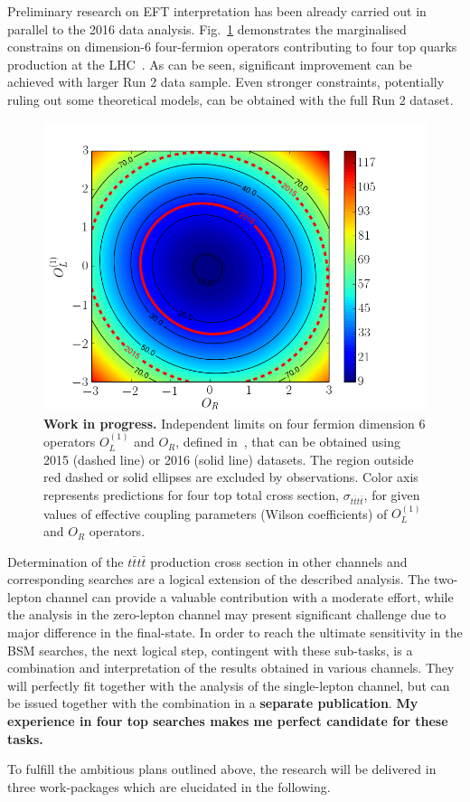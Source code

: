 \textcolor{\mynew}{
Preliminary research on EFT interpretation has been already carried out in parallel to the 2016 data analysis. Fig.~\ref{fig:C1_C2} demonstrates the marginalised constrains on dimension-6 four-fermion operators contributing to four top quarks production at the LHC~\cite{DegrandeEFTthesis,Zhang:2017mls}. As can be seen, significant improvement can be achieved with larger Run 2 data sample. Even stronger constraints, potentially ruling out some theoretical models, can be obtained with the full Run 2 dataset.
\begin{figure}[t]
\centering
\includegraphics[width=0.7\linewidth]{figures/C1_C2}
\caption{\textbf{Work in progress.} Independent limits on four fermion dimension 6 operators $O_{L}^{\left(1 \right) }$ and $O_R$, defined in~\cite{DegrandeEFTthesis}, that can be obtained using 2015 (dashed line) or 2016 (solid line) datasets. The region outside red dashed or solid ellipses are excluded by observations. Color axis represents predictions for four top total cross section, $\sigma_{t\bar{t}t\bar{t}}$, for given values of effective coupling parameters (Wilson coefficients) of $O_{L}^{\left(1 \right) }$ and $O_R$ operators.}
\label{fig:C1_C2}
\end{figure} 
}

\textcolor{\mycolor}{
Determination of the $t\bar{t}t\bar{t}$ production cross section in other channels and corresponding searches are a logical extension of the described analysis. The two-lepton channel can provide a valuable contribution with a moderate effort, while the analysis in the zero-lepton channel may present significant challenge due to major difference in the final-state. In order to reach the ultimate sensitivity in the BSM searches, the next logical step, contingent with these sub-tasks, is a combination and interpretation of the results obtained in various channels. They will perfectly fit together with the analysis of the single-lepton channel, but can be issued together with the combination in a \textbf{separate publication}. \textbf{My experience in four top searches makes me perfect candidate for these tasks.}}

\textcolor{\mycolor}{
To fulfill the ambitious plans outlined above, the research will be delivered in three work-packages which are elucidated in the following.}
